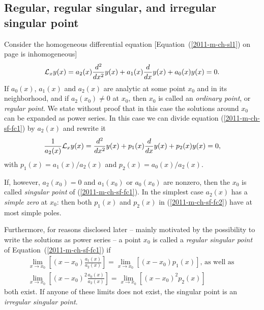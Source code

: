 \subsection{Regular,  regular singular, and irregular singular point}
Consider the homogeneous differential equation   [Equation~(\ref{2011-m-ch-sl1}) on page \pageref{2011-m-ch-sl1} is inhomogeneous]
\begin{equation}
{\cal L}_x y(x) =   a_2(x) \frac{d^2}{dx^2}y(x)  +  a_1(x) \frac{d}{dx}y(x)+   a_0(x) y(x)
 =
0.
\label{2011-m-ch-sf-fc1}
\end{equation}
If $a_0(x)$, $a_1(x)$ and $a_2(x)$ are analytic at some point $x_0$ and in its neighborhood,
and if $a_2(x_0)\neq 0$
at $x_0$, then
 $x_0$
is called an {\em ordinary point}, or {\em regular point}.
We  state without proof that in this case the solutions around $x_0$ can be expanded as power series.
In this case we can  divide equation (\ref{2011-m-ch-sf-fc1}) by $a_2(x)$ and rewrite it
\begin{equation}
\frac{1}{a_2(x)}{\cal L}_x y(x) =   \frac{d^2}{dx^2}y(x) +   p_1  (x)    \frac{d}{dx}y(x)+    p_2  (x)   y(x)
 =
0,
\label{2011-m-ch-sf-fc2}
\end{equation}
with
$  p_1  (x)  =    a_1(x) / a_2(x)
$
and
$ p_2 (x) =     a_0(x) / a_2(x)
$.

If, however, $a_2(x_0)= 0$ and $a_1(x_0)$ or $a_0(x_0)$ are nonzero, then the $x_0$ is called
{\em singular point}
 of (\ref{2011-m-ch-sf-fc1}).
In the simplest case $a_2(x)$ has a {\em simple zero} at $x_0$:
then both $  p_1  (x)  $ and $  p_2  (x)  $
in (\ref{2011-m-ch-sf-fc2})
have at most simple poles.


Furthermore, for reasons disclosed later
-- mainly motivated by the possibility to write the solutions as power series --
a point $x_0$ is called a
{\em regular singular point}
of Equation~(\ref{2011-m-ch-sf-fc1})
if
\begin{equation}
\begin{split}
\lim_{x\rightarrow x_0} \left[ (x-x_0)\frac{ a_1(x)}{a_2(x)} \right]
=
\lim_{x\rightarrow x_0} \left[ (x-x_0) p_1(x) \right]
\textrm{, as well as }\\
\lim_{x\rightarrow x_0} \left[ (x-x_0)^2 \frac{a_0(x)}{a_2(x)} \right]
=
\lim_{x\rightarrow x_0} \left[ (x-x_0)^2 p_2(x) \right]
\end{split}
\end{equation}
both exist.
If anyone of these limits does not exist, the singular point is
an
{\em irregular singular point}.


